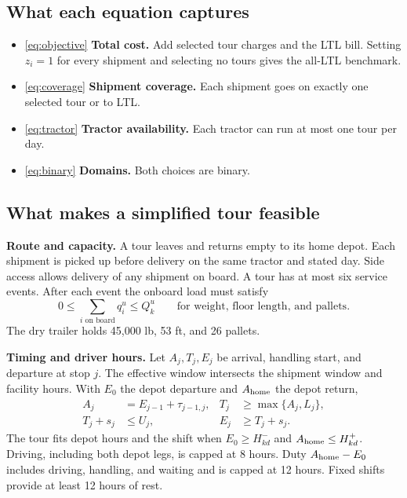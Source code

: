 \documentclass[11pt,letterpaper]{article}
\begin{document}
\subsection*{What each equation captures}

\begin{itemize}
\setlength{\itemsep}{1pt}
\item \eqref{eq:objective} \textbf{Total cost.} Add selected tour
charges and the LTL bill. Setting \(z_i=1\) for every shipment and
selecting no tours gives the all-LTL benchmark.
\item \eqref{eq:coverage} \textbf{Shipment coverage.} Each shipment
goes on exactly one selected tour or to LTL.
\item \eqref{eq:tractor} \textbf{Tractor availability.} Each tractor
can run at most one tour per day.
\item \eqref{eq:binary} \textbf{Domains.} Both choices are binary.
\end{itemize}

\subsection*{What makes a simplified tour feasible}

\textbf{Route and capacity.} A tour leaves and returns empty to its
home depot. Each shipment is picked up before delivery on the same
tractor and stated day. Side access allows delivery of any shipment
on board. A tour has at most six service events. After each event the
onboard load must satisfy
\[
0\le \sum_{i\text{ on board}}q_i^u\le Q_k^u
\qquad \text{for weight, floor length, and pallets}.
\]
The dry trailer holds 45,000 lb, 53 ft, and 26 pallets.

\textbf{Timing and driver hours.} Let \(A_j,T_j,E_j\) be arrival,
handling start, and departure at stop \(j\). The effective window
intersects the shipment window and facility hours. With \(E_0\) the
depot departure and \(A_{\rm home}\) the depot return,
\[
\begin{aligned}
A_j &= E_{j-1}+\tau_{j-1,j}, &
T_j &\ge \max\{A_j,L_j\},\\
T_j+s_j &\le U_j, &
E_j &\ge T_j+s_j .
\end{aligned}
\]
The tour fits depot hours and the shift when \(E_0\ge H^-_{kd}\)
and \(A_{\rm home}\le H^+_{kd}\). Driving, including both depot legs,
is capped at 8 hours. Duty \(A_{\rm home}-E_0\) includes driving,
handling, and waiting and is capped at 12 hours. Fixed shifts
provide at least 12 hours of rest.
\end{document}
